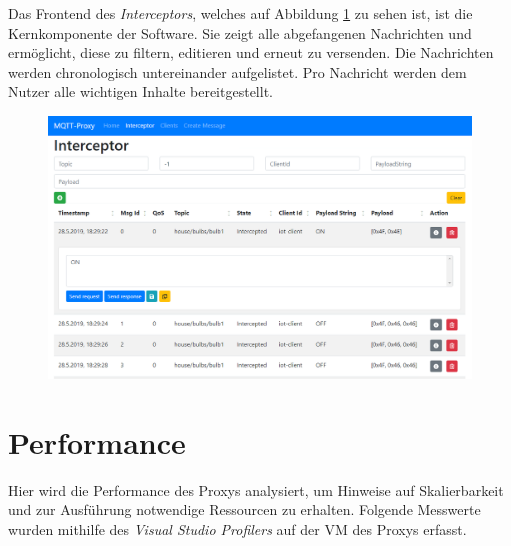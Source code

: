 Das Frontend des \emph{Interceptors}, welches auf Abbildung \ref{fig:frontend_messages} zu sehen ist, ist die Kernkomponente der Software. Sie zeigt alle abgefangenen Nachrichten und ermöglicht, diese zu filtern, editieren und erneut zu versenden. Die Nachrichten werden chronologisch untereinander aufgelistet. Pro Nachricht werden dem Nutzer alle wichtigen Inhalte bereitgestellt.
\begin{figure}[!h]%
    \centering
    \includegraphics[width=14cm]{tex/bilder/6_validierung/FrontendInterceptor.png}
    \label{fig:frontend_messages}
\end{figure}

\section{Performance}
    Hier wird die Performance des Proxys analysiert, um Hinweise auf Skalierbarkeit und zur Ausführung notwendige Ressourcen zu erhalten.
    Folgende Messwerte wurden mithilfe des \emph{Visual Studio Profilers} auf der \ac{VM} des Proxys erfasst.
    
